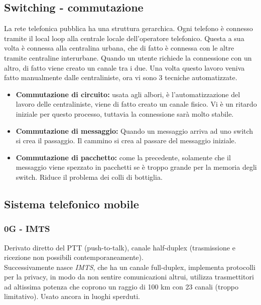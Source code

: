 \documentclass[10pt,a4paper,twoside]{article}
\begin{document}
\subsection{Switching - commutazione}
La rete telefonica pubblica ha una struttura gerarchica. Ogni telefono è connesso tramite il local loop alla centrale locale dell'operatore telefonico. Questa a sua volta è connessa alla centralina urbana, che di fatto è connessa con le altre tramite centraline interurbane. Quando un utente richiede la connessione con un altro, di fatto viene creato un canale tra i due. Una volta questo lavoro veniva fatto manualmente dalle centraliniste, ora vi sono 3 tecniche automatizzate.
\begin{itemize}
\item \textbf{Commutazione di circuito:} usata agli albori, è l'automatizzazione del lavoro delle centraliniste, viene di fatto creato un canale fisico. Vi è un ritardo iniziale per questo processo, tuttavia la connessione sarà molto stabile.
\item \textbf{Commutazione di messaggio:} Quando un messaggio arriva ad uno switch si crea il passaggio. Il cammino si crea al passare del messaggio iniziale.
\item \textbf{Commutazione di pacchetto:} come la precedente, solamente che il messaggio viene spezzato in pacchetti se è troppo grande per la memoria degli switch. Riduce il problema dei colli di bottiglia.
\end{itemize}

\subsection{Sistema telefonico mobile}
\subsubsection{0G - IMTS}
Derivato diretto del PTT (push-to-talk), canale half-duplex (trasmissione e ricezione non possibili contemporaneamente).\\
Successivamente nasce \textit{IMTS}, che ha un canale full-duplex, implementa protocolli per la privacy, in modo da non sentire comunicazioni altrui, utilizza trasmettitori ad altissima potenza che coprono un raggio di 100 km con 23 canali (troppo limitativo). Usato ancora in luoghi sperduti.
\end{document}
